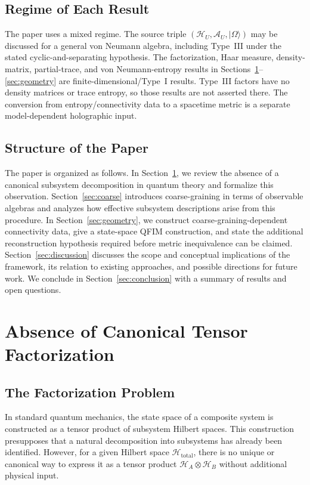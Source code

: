 \documentclass[12pt,a4paper]{article}
\begin{document}
\subsection{Regime of Each Result}

The paper uses a mixed regime.  The source triple $(\mathcal H_U,\mathcal A_U,|\Omega\rangle)$ may be discussed for a general von Neumann algebra, including Type~III under the stated cyclic-and-separating hypothesis.  The factorization, Haar measure, density-matrix, partial-trace, and von Neumann-entropy results in Sections~\ref{sec:nopref}--\ref{sec:geometry} are finite-dimensional/Type~I results.  Type~III factors have no density matrices or trace entropy, so those results are not asserted there.  The conversion from entropy/connectivity data to a spacetime metric is a separate model-dependent holographic input.

\subsection{Structure of the Paper}

The paper is organized as follows.
In Section~\ref{sec:nopref}, we review the absence of a canonical subsystem decomposition in quantum theory and formalize this observation.
Section~\ref{sec:coarse} introduces coarse-graining in terms of observable algebras and analyzes how effective subsystem descriptions arise from this procedure.
In Section~\ref{sec:geometry}, we construct coarse-graining-dependent connectivity data, give a state-space QFIM construction, and state the additional reconstruction hypothesis required before metric inequivalence can be claimed.
Section~\ref{sec:discussion} discusses the scope and conceptual implications of the framework, its relation to existing approaches, and possible directions for future work.
We conclude in Section~\ref{sec:conclusion} with a summary of results and open questions.

\section{Absence of Canonical Tensor Factorization}
\label{sec:nopref}

\subsection{The Factorization Problem}

In standard quantum mechanics, the state space of a composite system is constructed as a tensor product of subsystem Hilbert spaces. 
This construction presupposes that a natural decomposition into subsystems has already been identified. 
However, for a given Hilbert space $\mathcal{H}_{\text{total}}$, there is no unique or canonical way to express it as a tensor product $\mathcal{H}_A \otimes \mathcal{H}_B$ without additional physical input.
\end{document}

